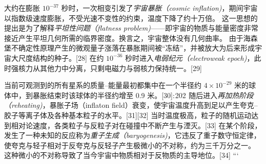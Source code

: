 大约在膨胀 $10^{-37}$ 秒时，一次相变引发了\emph{宇宙暴胀（cosmic inflation)}，期间宇宙以指数级速度膨胀，不受光速不变性的约束，温度下降了约十万倍。  
这一思想的提出是为了解释\emph{平坦性问题（flatness problem)}——即宇宙的物质与能量密度非常接近产生平坦几何所需的临界密度。换言之，宇宙整体没有几何曲率。  
由于海森堡不确定性原理产生的微观量子涨落在暴胀期间被“冻结”，并被放大为后来形成宇宙大尺度结构的种子。[28]  
在约 $10^{-36}$ 秒时进入\emph{电弱纪元（electroweak epoch)}，此时强核力从其他力中分离，只剩电磁力与弱核力保持统一。[29]

当前可观测到的所有星系的质量–能量最初都集中在一个半径约 $4\times10^{-29}$ 米的球体中，到暴胀结束时该球体的半径约增至 0.9 米。[30]: 202   
随后进入\emph{再加热阶段（reheating)}，暴胀子场（inflaton field）衰变，使宇宙温度升高到足以产生夸克–胶子等离子体及各种基本粒子的水平。[31][32]  
当时温度极高，粒子的随机运动达到相对论速度，各类粒子与反粒子对在碰撞中不断产生与湮灭。[33]  
在某个阶段，发生了一种未知的反应称为\emph{重子生成（baryogenesis)}，它违反了重子数守恒定律，使夸克与轻子相对于反夸克与反轻子产生极微小的不对称，约为三千万分之一。  
这种微小的不对称导致了当今宇宙中物质相对于反物质的主导地位。[34]
```


